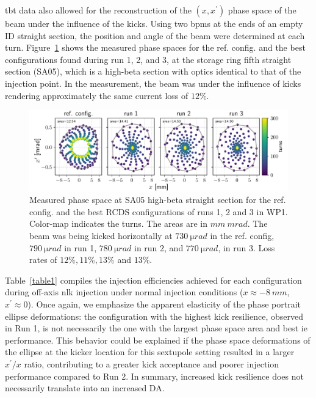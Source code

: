 \gls*{tbt} data also allowed for the reconstruction of the $(x,x^\prime)$ phase space of the beam under the influence of the kicks. Using two \glspl*{bpm} at the ends of an empty ID straight section, the position and angle of the beam were determined at each turn. Figure~\ref{fig:oldtunes_phase} shows the measured phase spaces for the ref. config. and the best configurations found during run 1, 2, and 3, at the storage ring fifth straight section (SA05), which is a high-beta section with optics identical to that of the injection point. In the measurement, the beam was under the influence of kicks rendering approximately the same current loss of $12\%$.
\begin{figure}[tb]
    \centering
        \includegraphics[width=\textwidth]{Images/WEPL087_f2.pdf}
        \caption[Measured phase space at SA05 high-beta straight section for the ref. config. and the best RCDS configurations of runs 1, 2 and 3 in WP1.]{Measured phase space at SA05 high-beta straight section for the ref. config. and the best \gls*{RCDS} configurations of runs 1, 2 and 3 in \gls*{WP1}. Color-map indicates the turns. The areas are in $\unit{mm}~\unit{mrad}$. The beam was being kicked horizontally at $730~\unit{\micro rad}$ in the ref. config, $790~\unit{\micro rad}$ in run 1, $780~\unit{\micro rad}$ in run 2, and $770~\unit{\micro rad}$, in run 3. Loss rates of  $12\%, 11\%, 13\%$ and $13\%$.}
        \label{fig:oldtunes_phase}
\end{figure}

Table~\ref{table1} compiles the injection efficiencies achieved for each configuration during off-axis \gls*{nlk} injection under normal injection conditions ($x\approx -8~\unit{mm}$, $x^\prime\approx 0 $).
Once again, we emphasize the apparent elasticity of the phase portrait ellipse deformations: the configuration with the highest kick resilience, observed in Run 1, is not necessarily the one with the largest phase space area and best \gls*{ie} performance. This behavior could be explained if the phase space deformations of the ellipse at the kicker location for this sextupole setting resulted in a larger $x^\prime/x$ ratio, contributing to a greater kick acceptance and poorer injection performance compared to Run 2. In summary, increased kick resilience does not necessarily translate into an increased \gls*{DA}.

